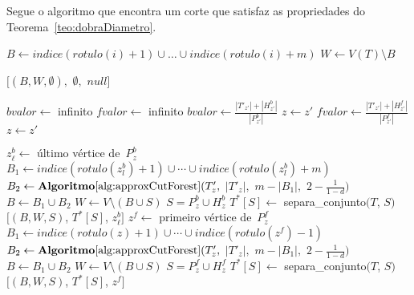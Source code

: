 		Segue o algoritmo que encontra um corte que satisfaz as propriedades do
		Teorema~\ref{teo:dobraDiametro}.

		\bigskip

	\begin{algorithm}[H]
	\label{alg:dobraDiametro}

		\caption{}
		{
			{
				$B\gets indice(rotulo(i)+1)\cup\ldots\cup indice(rotulo(i)+m)$\;
				$W\gets V(T)\setminus B$\;

				\Return $[(B,W,\emptyset),$ $\emptyset,$ $null]$\;
			}
		}
		$bvalor \gets$ infinito \;
		$fvalor \gets$ infinito\;
		{
			{
			 	$bvalor \gets \frac{|T'_{z'}|+|H_{z'}^b|}{|P^b_{z'}|}$\;
			 	$z \gets z'$\; 
			}
		}
		{
			{
			 	$fvalor \gets \frac{|T'_{z'}|+|H_{z'}^f|}{|P^f_{z'}|}$\;
			 	$z \gets z'$\; 
			}
		}
	\end{algorithm}	

	\LinesNumberedHidden
	\begin{algorithm}[H]
	\Numberline
		{
			\Numberline$z^b_\ell \gets $ último vértice de~$P_z^b$\;
			\Numberline$B_1 \gets indice(rotulo(z^b_l)+1)\cup\cdots\cup indice(rotulo(z^b_l)+m)$\;
			\Numberline$B_2 \gets \mathbf {Algoritmo\ref{alg:approxCutForest}}(T'_z,$ $|T'_z|,$ $m-|B_1|,$ $2-\frac{1}{1-d})$\;
			\Numberline$B \gets B_1\cup B_2$\;
			\Numberline$W \gets V\setminus (B\cup S)$\; 
			\Numberline$S = P_z^b\cup H^b_z $\;
			\Numberline$T^*[S]\gets $ {\sc separa\_conjunto}$(T$, $S)$\;
			\Numberline\Return $[(B,W,S)$, $T^*[S]$, $z^b_\ell]$\;
		}
		\Numberline
		\Else
		{
			\Numberline$z^f \gets $ primeiro vértice de~$P_z^f$\;
			\Numberline$B_1 \gets indice(rotulo(z)+1)\cup\cdots\cup indice(rotulo(z^f)-1)$\;
			\Numberline$B_2 \gets \mathbf {Algoritmo\ref{alg:approxCutForest}}(T'_z,$ $|T'_z|,$ $m-|B_1|,$ $2-\frac{1}{1-d})$\;
			\Numberline$B \gets B_1\cup B_2$\;
			\Numberline$W \gets V\setminus (B\cup S)$\; 
			\Numberline$S = P_z^f\cup H^f_z $\;
			\Numberline$T^*[S]\gets $ {\sc separa\_conjunto}$(T$, $S)$\;
			\Numberline\Return $[(B,W,S)$, $T^*[S]$, $z^f]$\;		
		}
	\end{algorithm}	
	\LinesNumbered
	\bigskip
